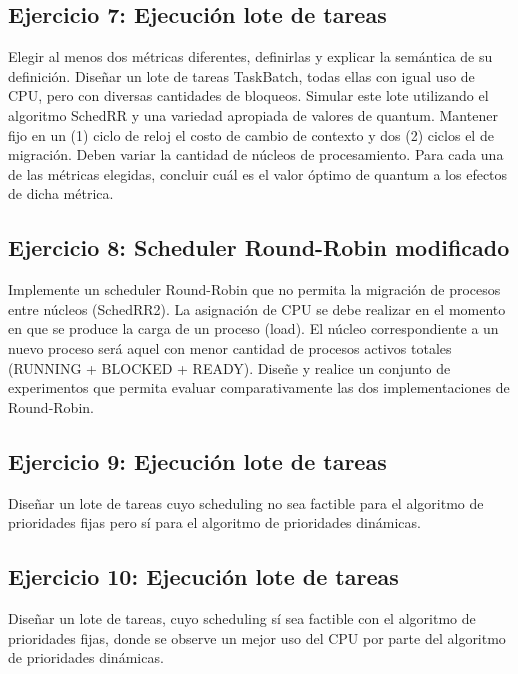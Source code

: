 \documentclass[a4paper]{article}
\begin{document}
 \subsection{Ejercicio 7: Ejecuci\'on lote de tareas}
Elegir al menos dos m\'etricas diferentes, definirlas y explicar la sem\'antica de su definici\'on. Dise\~nar un lote de tareas TaskBatch, todas ellas con igual uso de CPU, pero con diversas cantidades de bloqueos. Simular este lote utilizando el algoritmo SchedRR y una variedad apropiada de valores de quantum. Mantener fijo en un (1) ciclo de reloj el costo de cambio de contexto y dos (2) ciclos el de migraci\'on. Deben variar la cantidad de n\'ucleos de procesamiento. Para cada una de las m\'etricas elegidas, concluir cu\'al es el valor \'optimo de quantum a los efectos de dicha m\'etrica.

 \subsection{Ejercicio 8: Scheduler Round-Robin modificado}
Implemente un scheduler Round-Robin que no permita la migraci\'on de procesos entre n\'ucleos (SchedRR2). La asignaci\'on de CPU se debe realizar en el momento en que se produce la carga de un proceso (load). El n\'ucleo correspondiente a un nuevo proceso ser\'a aquel con menor cantidad de procesos activos totales (RUNNING + BLOCKED + READY). Dise\~ne y realice un conjunto de experimentos que permita evaluar comparativamente las dos implementaciones de Round-Robin.

 \subsection{Ejercicio 9:  Ejecuci\'on lote de tareas}
Dise\~nar un lote de tareas cuyo scheduling no sea factible para el algoritmo de prioridades fijas pero s\'i para el algoritmo de prioridades din\'amicas.

 \subsection{Ejercicio 10:  Ejecuci\'on lote de tareas}
Dise\~nar un lote de tareas, cuyo scheduling s\'i sea factible con el algoritmo de prioridades fijas, donde se observe un mejor uso del CPU por parte del algoritmo de prioridades din\'amicas.
\end{document}
